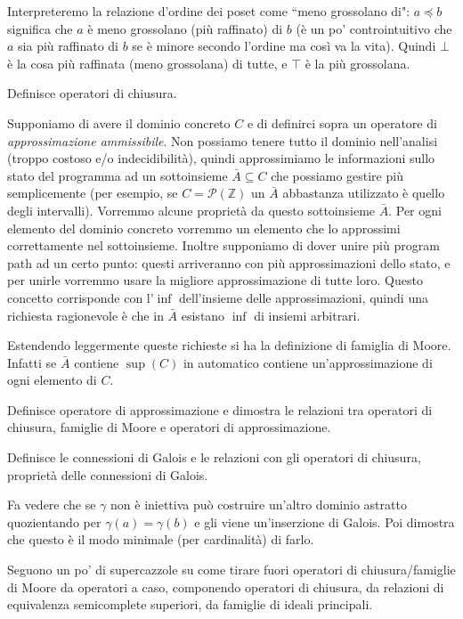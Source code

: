 \documentclass[12pt]{article}
\numberwithin{theorem}{subsection}
\newcommand{\pow}[1]{\mathcal{P}(#1)}
\begin{document}
Interpreteremo la relazione d'ordine dei poset come ``meno grossolano di": $a \preceq b$ significa che $a$ è meno grossolano (più raffinato) di $b$ (è un po' controintuitivo che $a$ sia più raffinato di $b$ se è minore secondo l'ordine ma così va la vita). Quindi $\bot$ è la cosa più raffinata (meno grossolana) di tutte, e $\top$ è la più grossolana.

Definisce operatori di chiusura.

Supponiamo di avere il dominio concreto $C$ e di definirci sopra un operatore di \textit{approssimazione ammissibile}. Non possiamo tenere tutto il dominio nell'analisi (troppo costoso e/o indecidibilità), quindi approssimiamo le informazioni sullo stato del programma ad un sottoinsieme $\bar{A} \subseteq C$ che possiamo gestire più semplicemente (per esempio, se $C = \pow{\mathbb{Z}}$ un $\bar{A}$ abbastanza utilizzato è quello degli intervalli).
Vorremmo alcune proprietà da questo sottoinsieme $\bar{A}$.
Per ogni elemento del dominio concreto vorremmo un elemento che lo approssimi correttamente nel sottoinsieme.
Inoltre supponiamo di dover unire più program path ad un certo punto: questi arriveranno con più approssimazioni dello stato, e per unirle vorremmo usare la migliore approssimazione di tutte loro. Questo concetto corrisponde con l'$\inf$ dell'insieme delle approssimazioni, quindi una richiesta ragionevole è che in $\bar{A}$ esistano $\inf$ di insiemi arbitrari.

Estendendo leggermente queste richieste si ha la definizione di famiglia di Moore. Infatti se $\bar{A}$ contiene $\sup(C)$ in automatico contiene un'approssimazione di ogni elemento di $C$.

Definisce operatore di approssimazione e dimostra le relazioni tra operatori di chiusura, famiglie di Moore e operatori di approssimazione.

Definisce le connessioni di Galois e le relazioni con gli operatori di chiusura, proprietà delle connessioni di Galois.

Fa vedere che se $\gamma$ non è iniettiva può costruire un'altro dominio astratto quozientando per $\gamma(a) = \gamma(b)$ e gli viene un'inserzione di Galois. Poi dimostra che questo è il modo minimale (per cardinalità) di farlo.

Seguono un po' di supercazzole su come tirare fuori operatori di chiusura/famiglie di Moore da operatori a caso, componendo operatori di chiusura, da relazioni di equivalenza semicomplete superiori, da famiglie di ideali principali.
\end{document}
